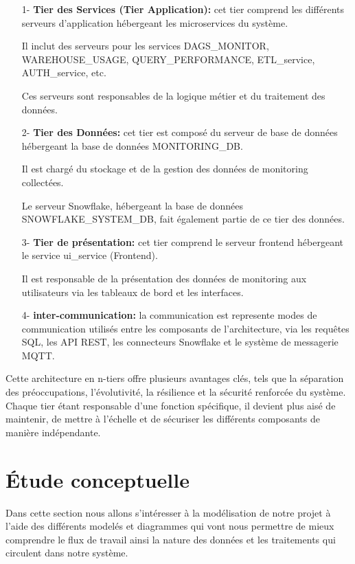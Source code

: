         \begin{enumerate}
            \item[1-] \textbf{Tier des Services (Tier Application): } 
            cet tier comprend les différents serveurs d'application hébergeant les microservices du système.
            \par Il inclut des serveurs pour les services DAGS\_MONITOR, WAREHOUSE\_USAGE, QUERY\_PERFORMANCE, ETL\_service, AUTH\_service, etc.
            \par Ces serveurs sont responsables de la logique métier et du traitement des données.
            \item [2-] \textbf{Tier des Données:} 
            cet tier est composé du serveur de base de données hébergeant la base de données MONITORING\_DB.
            \par Il est chargé du stockage et de la gestion des données de monitoring collectées.
            \par Le serveur Snowflake, hébergeant la base de données SNOWFLAKE\_SYSTEM\_DB, fait également partie de ce tier des données.
             
            \item[3-]  \textbf{Tier de présentation: }
            cet tier comprend le serveur frontend hébergeant le service ui\_service (Frontend).
            \par Il est responsable de la présentation des données de monitoring aux utilisateurs via les tableaux de bord et les interfaces.
            \item[4-] \textbf{inter-communication:}
            la communication est represente modes de communication utilisés entre les composants de l'architecture, via les requêtes SQL, les API REST, les connecteurs Snowflake et le système de messagerie MQTT.

        \end{enumerate}
    \par Cette architecture en n-tiers offre plusieurs avantages clés, tels que la séparation des préoccupations, l'évolutivité, la résilience et la sécurité renforcée du système. 
    Chaque tier étant responsable d'une fonction spécifique, il devient plus aisé de maintenir, de mettre à l'échelle et de sécuriser les différents composants de manière indépendante.
\section{Étude conceptuelle}
\par Dans cette section nous allons s'intéresser à la modélisation de notre projet à l'aide des différents modelés et diagrammes qui vont nous permettre de mieux comprendre le flux de travail ainsi la nature des données et les traitements qui circulent dans notre système.
